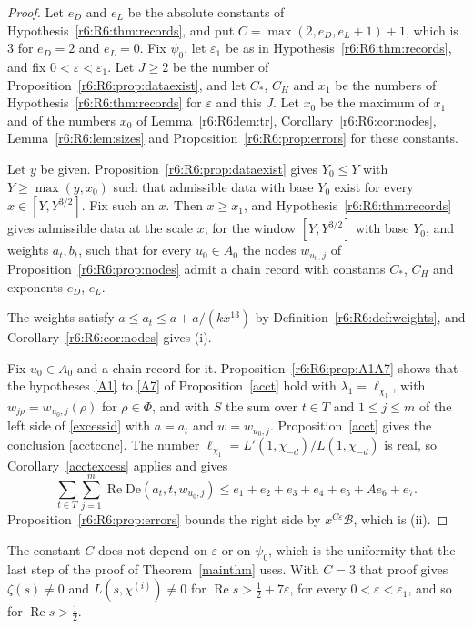 \begin{proof}
Let $e_D$ and $e_L$ be the absolute constants of Hypothesis~\ref{r6:R6:thm:records}, and put $C=\max(2,e_D,e_L+1)+1$, which is $3$ for $e_D=2$ and $e_L=0$. Fix $\psi_0$, let $\varepsilon_1$ be as in Hypothesis~\ref{r6:R6:thm:records}, and fix $0<\varepsilon<\varepsilon_1$. Let $J\ge2$ be the number of Proposition~\ref{r6:R6:prop:dataexist}, and let $C_\ast$, $C_H$ and $x_1$ be the numbers of Hypothesis~\ref{r6:R6:thm:records} for $\varepsilon$ and this $J$. Let $x_0$ be the maximum of $x_1$ and of the numbers $x_0$ of Lemma~\ref{r6:R6:lem:tr}, Corollary~\ref{r6:R6:cor:nodes}, Lemma~\ref{r6:R6:lem:sizes} and Proposition~\ref{r6:R6:prop:errors} for these constants.

Let $y$ be given. Proposition~\ref{r6:R6:prop:dataexist} gives $Y_0\le Y$ with $Y\ge\max(y,x_0)$ such that admissible data with base $Y_0$ exist for every $x\in[Y,Y^{3/2}]$. Fix such an $x$. Then $x\ge x_1$, and Hypothesis~\ref{r6:R6:thm:records} gives admissible data at the scale $x$, for the window $[Y,Y^{3/2}]$ with base $Y_0$, and weights $a_t,b_t$, such that for every $u_0\in A_0$ the nodes $w_{u_0,j}$ of Proposition~\ref{r6:R6:prop:nodes} admit a chain record with constants $C_\ast$, $C_H$ and exponents $e_D$, $e_L$.

The weights satisfy $a\le a_t\le a+a/(kx^{13})$ by Definition~\ref{r6:R6:def:weights}, and Corollary~\ref{r6:R6:cor:nodes} gives (i).

Fix $u_0\in A_0$ and a chain record for it. Proposition~\ref{r6:R6:prop:A1A7} shows that the hypotheses \eqref{A1} to \eqref{A7} of Proposition~\ref{acct} hold with $\lambda_1=\ell_{\chi_1}$, with $w_{j\rho}=w_{u_0,j}(\rho)$ for $\rho\in\Phi$, and with $S$ the sum over $t\in T$ and $1\le j\le m$ of the left side of \eqref{excessid} with $a=a_t$ and $w=w_{u_0,j}$. Proposition~\ref{acct} gives the conclusion \eqref{acctconc}. The number $\ell_{\chi_1}=L'(1,\chi_{-d})/L(1,\chi_{-d})$ is real, so Corollary~\ref{acctexcess} applies and gives
\[
\sum_{t\in T}\sum_{j=1}^m\operatorname{Re}\mathrm{De}(a_t,t,w_{u_0,j})\le e_1+e_2+e_3+e_4+e_5+Ae_6+e_7 .
\]
Proposition~\ref{r6:R6:prop:errors} bounds the right side by $x^{C\varepsilon}\mathcal B$, which is (ii).
\end{proof}

The constant $C$ does not depend on $\varepsilon$ or on $\psi_0$, which is the uniformity that the last step of the proof of Theorem~\ref{mainthm} uses. With $C=3$ that proof gives $\zeta(s)\ne0$ and $L(s,\chi^{(i)})\ne0$ for $\operatorname{Re}s>\frac12+7\varepsilon$, for every $0<\varepsilon<\varepsilon_1$, and so for $\operatorname{Re}s>\frac12$.

